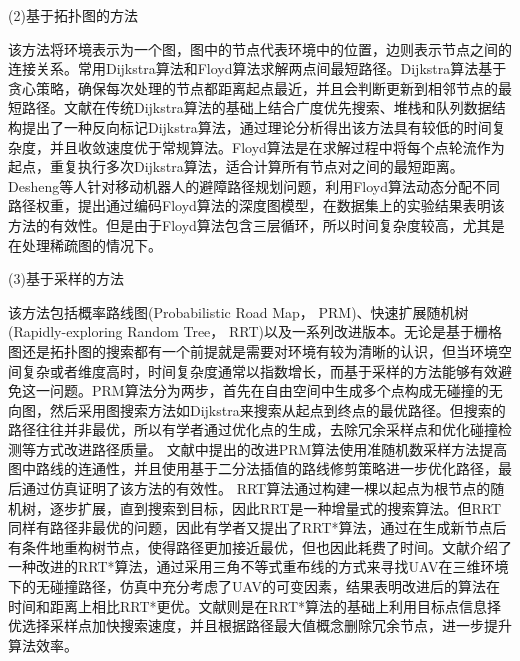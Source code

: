 (2)基于拓扑图的方法

    该方法将环境表示为一个图，图中的节点代表环境中的位置，边则表示节点之间的连接关系。常用Dijkstra算法和Floyd算法求解两点间最短路径。Dijkstra算法基于贪心策略，确保每次处理的节点都距离起点最近，并且会判断更新到相邻节点的最短路径。文献\parencite{zhuNewAlgorithmBased2021}在传统Dijkstra算法的基础上结合广度优先搜索、堆栈和队列数据结构提出了一种反向标记Dijkstra算法，通过理论分析得出该方法具有较低的时间复杂度，并且收敛速度优于常规算法。Floyd算法是在求解过程中将每个点轮流作为起点，重复执行多次Dijkstra算法，适合计算所有节点对之间的最短距离。
    Desheng等人针对移动机器人的避障路径规划问题，利用Floyd算法动态分配不同路径权重，提出通过编码Floyd算法的深度图模型，在数据集上的实验结果表明该方法的有效性\cite{lyu2021robot}。但是由于Floyd算法包含三层循环，所以时间复杂度较高，尤其是在处理稀疏图的情况下\cite{智能驾驶汽车规划控制算法及仿真应用}。
    
(3)基于采样的方法

该方法包括概率路线图(Probabilistic Road Map， PRM)\cite{geraertsComparativeStudyProbabilistic2004}、快速扩展随机树(Rapidly-exploring Random Tree， RRT)\cite{lavalleRandomizedKinodynamicPlanning2001}以及一系列改进版本。无论是基于栅格图还是拓扑图的搜索都有一个前提就是需要对环境有较为清晰的认识，但当环境空间复杂或者维度高时，时间复杂度通常以指数增长，而基于采样的方法能够有效避免这一问题。PRM算法分为两步，首先在自由空间中生成多个点构成无碰撞的无向图，然后采用图搜索方法如Dijkstra来搜索从起点到终点的最优路径。但搜索的路径往往并非最优，所以有学者通过优化点的生成，去除冗余采样点和优化碰撞检测等方式改进路径质量\cite{liSmartVehiclePath2022}。
文献\parencite{JXCD202412013}中提出的改进PRM算法使用准随机数采样方法提高图中路线的连通性，并且使用基于二分法插值的路线修剪策略进一步优化路径，最后通过仿真证明了该方法的有效性。
RRT算法通过构建一棵以起点为根节点的随机树，逐步扩展，直到搜索到目标，因此RRT是一种增量式的搜索算法。但RRT同样有路径非最优的问题，因此有学者又提出了RRT*算法，通过在生成新节点后有条件地重构树节点，使得路径更加接近最优，但也因此耗费了时间。文献\parencite{fusicImprovedRRTAlgorithmBased2024}介绍了一种改进的RRT*算法，通过采用三角不等式重布线的方式来寻找UAV在三维环境下的无碰撞路径，仿真中充分考虑了UAV的可变因素，结果表明改进后的算法在时间和距离上相比RRT*更优。文献\parencite{郭利进2024基于改进}则是在RRT*算法的基础上利用目标点信息择优选择采样点加快搜索速度，并且根据路径最大值概念删除冗余节点，进一步提升算法效率。

